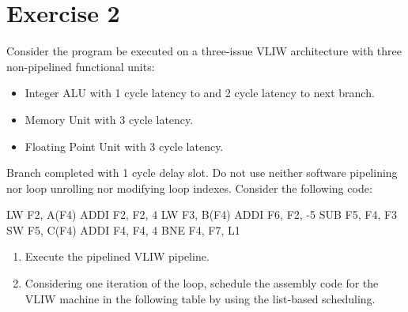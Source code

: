 \section{Exercise 2}

Consider the program be executed on a three-issue VLIW architecture with three non-pipelined functional units:
\begin{itemize}
    \item Integer ALU with 1 cycle latency to and 2 cycle latency to next branch. 
    \item Memory Unit with 3 cycle latency. 
    \item Floating Point Unit with 3 cycle latency. 
\end{itemize}
Branch completed with 1 cycle delay slot. 
Do not use neither software pipelining nor loop unrolling nor modifying loop indexes.
Consider the following code: 
\begin{verbnobox}[\verbarg]
LW F2, A(F4)
ADDI F2, F2, 4
LW F3, B(F4)
ADDI F6, F2, -5
SUB F5, F4, F3
SW F5, C(F4)
ADDI F4, F4, 4
BNE F4, F7, L1
\end{verbnobox}
\begin{enumerate}
    \item Execute the pipelined VLIW pipeline. 
    \item Considering one iteration of the loop, schedule the assembly code for the VLIW machine in the following table by using the list-based scheduling.
\end{enumerate}


